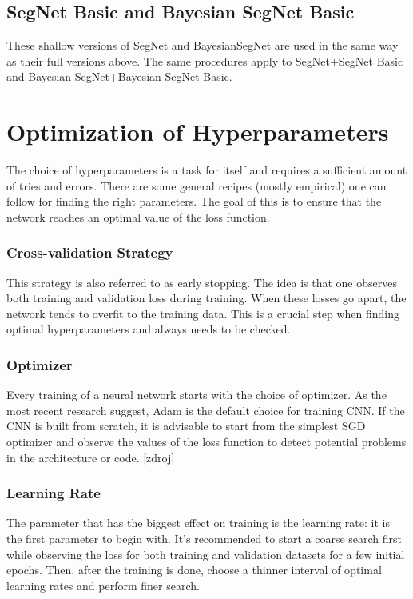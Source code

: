 \subsection{SegNet Basic and Bayesian SegNet Basic}

These shallow versions of SegNet and BayesianSegNet are used in the same way as their full versions above. The same procedures apply to SegNet+SegNet Basic and Bayesian SegNet+Bayesian SegNet Basic.

\section{Optimization of Hyperparameters}

The choice of hyperparameters is a task for itself and requires a sufficient amount of tries and errors. There are some general recipes (mostly empirical) one can follow for finding the right parameters. The goal of this is to ensure that the network reaches an optimal value of the loss function.  

\subsubsection{Cross-validation Strategy}

This strategy is also referred to as early stopping. The idea is that one observes both training and validation loss during training. When these losses go apart, the network tends to overfit to the training data. This is a crucial step when finding optimal hyperparameters and always needs to be checked.

\subsubsection{Optimizer}

Every training of a neural network starts with the choice of optimizer. As the most recent research suggest, Adam is the default choice for training CNN. If the CNN is built from scratch, it is advisable to start from the simplest SGD optimizer and observe the values of the loss function to detect potential problems in the architecture or code. [zdroj] 

\subsubsection{Learning Rate}

The parameter that has the biggest effect on training is the learning rate: it is the first parameter to begin with. It's recommended to start a coarse search first while observing the loss for both training and validation datasets for a few initial epochs. Then, after the training is done, choose a thinner interval of optimal learning rates and perform finer search. 

